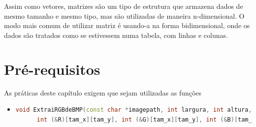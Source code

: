 Assim como vetores, matrizes são um tipo de estrutura que armazena dados de mesmo tamanho e mesmo tipo, mas são utilizadas de maneira n-dimensional. O modo mais comum de utilizar matriz é usando-a na forma bidimensional, onde os dados são tratados como se estivessem numa tabela, com linhas e colunas.


%
%







\section*{Pré-requisitos}

As práticas deste capítulo exigem que sejam utilizadas as funções
\begin{itemize}
  \item 
    \begin{lstlisting}[language=C++]
    void ExtraiRGBdeBMP(const char *imagepath, int largura, int altura, 
      int (&R)[tam_x][tam_y], int (&G)[tam_x][tam_y], int (&B)[tam_x][tam_y])
    \end{lstlisting}
 
\end{itemize}

